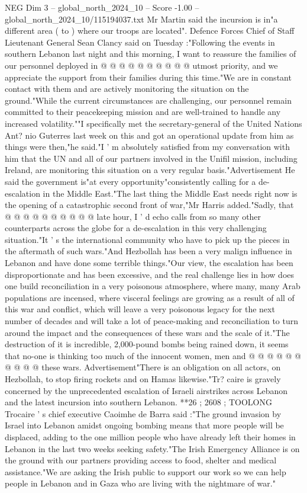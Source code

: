 \begin{textsample}{NEG Dim 3 – global\_north\_2024\_10 – Score -1.00 – global\_north\_2024\_10/115194037.txt}
Mr Martin said the incursion is in"a different area ( to ) where our troops are located".
Defence Forces Chief of Staff Lieutenant General Sean Clancy said on Tuesday :"Following the events in southern Lebanon last night and this morning, I want to reassure the families of our personnel deployed in @ @ @ @ @ @ @ @ @ @ utmost priority, and we appreciate the support from their families during this time."We are in constant contact with them and are actively monitoring the situation on the ground."While the current circumstances are challenging, our personnel remain committed to their peacekeeping mission and are well-trained to handle any increased volatility.""I specifically met the secretary-general of the United Nations Ant? nio Guterres last week on this and got an operational update from him as things were then,"he said."I ' m absolutely satisfied from my conversation with him that the UN and all of our partners involved in the Unifil mission, including Ireland, are monitoring this situation on a very regular basis."Advertisement He said the government is"at every opportunity"consistently calling for a de-escalation in the Middle East."The last thing the Middle East needs right now is the opening of a catastrophic second front of war,"Mr Harris added."Sadly, that @ @ @ @ @ @ @ @ @ @ late hour, I ' d echo calls from so many other counterparts across the globe for a de-escalation in this very challenging situation."It ' s the international community who have to pick up the pieces in the aftermath of such wars."And Hezbollah has been a very malign influence in Lebanon and have done some terrible things."Our view, the escalation has been disproportionate and has been excessive, and the real challenge lies in how does one build reconciliation in a very poisonous atmosphere, where many, many Arab populations are incensed, where visceral feelings are growing as a result of all of this war and conflict, which will leave a very poisonous legacy for the next number of decades and will take a lot of peace-making and reconciliation to turn around the impact and the consequences of these wars and the scale of it."The destruction of it is incredible, 2,000-pound bombs being rained down, it seems that no-one is thinking too much of the innocent women, men and @ @ @ @ @ @ @ @ @ @ these wars.
Advertisement"There is an obligation on all actors, on Hezbollah, to stop firing rockets and on Hamas likewise."Tr? caire is gravely concerned by the unprecedented escalation of Israeli airstrikes across Lebanon and the latest incursion into southern Lebanon. **26 ; 2608 ; TOOLONG Trocaire ' s chief executive Caoimhe de Barra said :"The ground invasion by Israel into Lebanon amidst ongoing bombing means that more people will be displaced, adding to the one million people who have already left their homes in Lebanon in the last two weeks seeking safety."The Irish Emergency Alliance is on the ground with our partners providing access to food, shelter and medical assistance."We are asking the Irish public to support our work so we can help people in Lebanon and in Gaza who are living with the nightmare of war."

\end{textsample}
